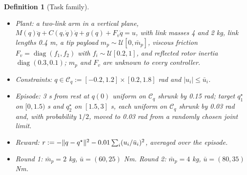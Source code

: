 \documentclass[11pt]{article}\usepackage[margin=1in]{geometry}\usepackage{amsmath,amssymb,amsthm,mathtools}\usepackage{graphicx}\graphicspath{{figures/}{../figures/}{figs/}{./}}\usepackage{enumitem}\usepackage{hyperref}\usepackage{cleveref}\usepackage{tikz}\usetikzlibrary{arrows.meta,positioning,calc,shapes.geometric}\usepackage{float}\usepackage[most]{tcolorbox}\usepackage{kotex}\usepackage{booktabs}\emergencystretch=1.6em\tolerance=2000 \crefname{assumption}{Assumption}{Assumptions}\Crefname{assumption}{Assumption}{Assumptions}\crefname{definition}{Definition}{Definitions}\Crefname{definition}{Definition}{Definitions}\crefname{proposition}{Proposition}{Propositions}\Crefname{proposition}{Proposition}{Propositions}\crefname{fact}{Fact}{Facts}\Crefname{fact}{Fact}{Facts} \newtheorem{assumption}{Assumption}\newtheorem{definition}{Definition}\newtheorem{lemma}{Lemma}\newtheorem{proposition}{Proposition}\newtheorem{theorem}{Theorem}\newtheorem{corollary}{Corollary}\newtheorem{fact}{Fact}\theoremstyle{remark}\newtheorem{remark}{Remark} \newcommand{\R}{\mathbb{R}}\newcommand{\U}{\mathcal U}
\begin{document}
\begin{definition}[Task family]
\label{def:task}
\begin{itemize}
\item Plant: a two-link arm in a vertical plane, $M(q)\ddot q+C(q,\dot q)\dot q+g(q)+F_v\dot q=u$, with link masses 4 and 2 kg, link lengths 0.4 m, a tip payload $m_p\sim\mathcal U[0,\bar m_p]$, viscous friction $F_v=\operatorname{diag}(f_1,f_2)$ with $f_i\sim\mathcal U[0.2,1]$, and reflected rotor inertia $\operatorname{diag}(0.3,0.1)$; $m_p$ and $F_v$ are unknown to every controller.
\item Constraints: $q\in\mathcal C_q:=[-0.2,1.2]\times[0.2,1.8]$ rad and $|u_i|\le\bar u_i$.
\item Episode: 3 s from rest at $q(0)$ uniform on $\mathcal C_q$ shrunk by 0.15 rad; target $q^\star_1$ on $[0,1.5)$ s and $q^\star_2$ on $[1.5,3]$ s, each uniform on $\mathcal C_q$ shrunk by 0.03 rad and, with probability $1/2$, moved to 0.03 rad from a randomly chosen joint limit.
\item Reward: $r:=-\lVert q-q^\star\rVert^2-0.01\sum_i(u_i/\bar u_i)^2$, averaged over the episode.
\item Round 1: $\bar m_p=2$ kg, $\bar u=(60,25)$ Nm. Round 2: $\bar m_p=4$ kg, $\bar u=(80,35)$ Nm.
\end{itemize}
\end{definition}
\end{document}
